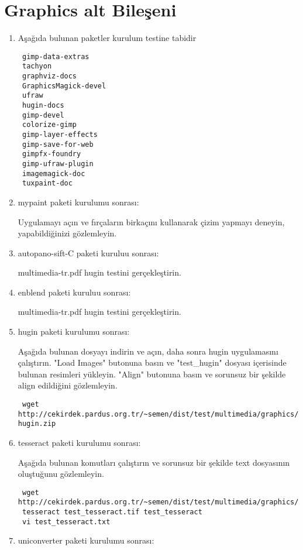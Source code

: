 \documentclass[a4paper,10pt]{article}
\begin{document}
\section{Graphics alt Bileşeni}
\begin{enumerate}
 \item Aşağıda bulunan paketler kurulum testine tabidir
\begin{verbatim}
 gimp-data-extras
 tachyon
 graphviz-docs
 GraphicsMagick-devel
 ufraw
 hugin-docs
 gimp-devel
 colorize-gimp
 gimp-layer-effects
 gimp-save-for-web
 gimpfx-foundry
 gimp-ufraw-plugin
 imagemagick-doc
 tuxpaint-doc 
\end{verbatim}
\item mypaint paketi kurulumu sonrası:

Uygulamayı açın ve fırçaların birkaçını kullanarak çizim yapmayı deneyin, yapabildiğinizi gözlemleyin.

\item autopano-sift-C paketi kuruluu sonrası:

multimedia-tr.pdf hugin testini gerçekleştirin.

\item enblend paketi kuruluu sonrası:

multimedia-tr.pdf hugin testini gerçekleştirin.

\item hugin paketi kurulumu sonrası:

Aşağıda bulunan dosyayı indirin ve açın, daha sonra hugin uygulamasını çalıştırın. "Load Images" butonuna basın ve "test\_hugin" dosyası içerisinde bulunan resimleri yükleyin. "Align" butonuna basın ve sorunsuz bir şekilde align edildiğini gözlemleyin. 

\begin{verbatim}
 wget http://cekirdek.pardus.org.tr/~semen/dist/test/multimedia/graphics/test-hugin.zip
\end{verbatim}


\item tesseract paketi kurulumu sonrası:

Aşağıda bulunan komutları çalıştırın ve sorunsuz bir şekilde text dosyasının oluştuğunu gözlemleyin.
\begin{verbatim}
 wget http://cekirdek.pardus.org.tr/~semen/dist/test/multimedia/graphics/test_tesseract.tif
 tesseract test_tesseract.tif test_tesseract
 vi test_tesseract.txt
\end{verbatim}

\item uniconverter paketi kurulumu sonrası:


\end{enumerate}
\end{document}

